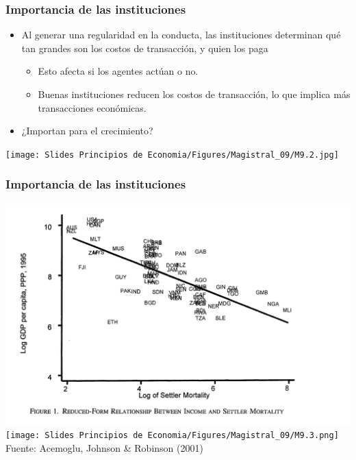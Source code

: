 \documentclass{beamer}
\begin{document}
\begin{frame}
\frametitle{Importancia de las instituciones}
\begin{itemize}
    \item Al generar una regularidad en la conducta, las instituciones determinan qué tan grandes son los costos de transacción, y quien los paga\vspace{1mm}
    \begin{itemize}
        \item Esto afecta si los agentes actúan o no.
        \item Buenas instituciones reducen los costos de transacción, lo que implica más transacciones económicas.\vspace{1mm}
    \end{itemize}
    \item ¿Importan para el crecimiento?
\end{itemize}
    \begin{center}
        \texttt{[image: Slides Principios de Economia/Figures/Magistral\_09/M9.2.jpg]}
    \end{center}
\end{frame}

\begin{frame}
\frametitle{Importancia de las instituciones}
\centering
\includegraphics[scale=0.25]{Slides Principios de Economia/Figures/Tema_04.1_examples2.png} \vspace{2mm}
 \texttt{[image: Slides Principios de Economia/Figures/Magistral\_09/M9.3.png]} \\ \vspace{2mm}
\small Fuente: Acemoglu, Johnson & Robinson (2001)
\end{frame}
\end{document}

